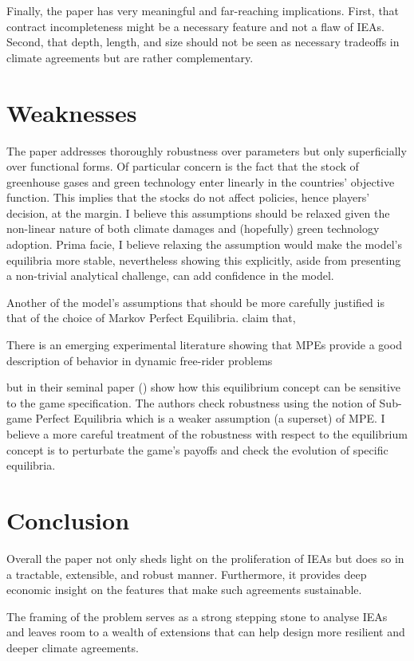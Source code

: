 \documentclass[american]{scrartcl}
\newcommand{\citein}[1]{\citeauthor{#1} (\citeyear{#1})}
\begin{document}
Finally, the paper has very meaningful and far-reaching implications. First, that contract incompleteness might be a necessary feature and not a flaw of IEAs. Second, that depth, length, and size should not be seen as necessary tradeoffs in climate agreements but are rather complementary.

\section{Weaknesses}

The paper addresses thoroughly robustness over parameters but only superficially over functional forms. Of particular concern is the fact that the stock of greenhouse gases and green technology enter linearly in the countries' objective function. This implies that the stocks do not affect policies, hence players' decision, at the margin. I believe this assumptions should be relaxed given the non-linear nature of both climate damages and (hopefully) green technology adoption. Prima facie, I believe relaxing the assumption would make the model's equilibria more stable, nevertheless showing this explicitly, aside from presenting a non-trivial analytical challenge, can add confidence in the model.

Another of the model's assumptions that should be more carefully justified is that of the choice of Markov Perfect Equilibria. \citeauthor{Battaglini2016} claim that,

\begin{displayquote}[p. 169][]
    There is an emerging experimental literature showing that MPEs provide a good description of behavior in dynamic free-rider problems
\end{displayquote}

but in their seminal paper \citein{Maskin1988} show how this equilibrium concept can be sensitive to the game specification. The authors check robustness using the notion of Sub-game Perfect Equilibria which is a weaker assumption (a superset) of MPE. I believe a more careful treatment of the robustness with respect to the equilibrium concept is to perturbate the game's payoffs and check the evolution of specific equilibria.

\section{Conclusion}

Overall the paper not only sheds light on the proliferation of IEAs but does so in a tractable, extensible, and robust manner. Furthermore, it provides deep economic insight on the features that make such agreements sustainable.

The framing of the problem serves as a strong stepping stone to analyse IEAs and leaves room to a wealth of extensions that can help design more resilient and deeper climate agreements.

\newpage
\nocite{*}
\printbibliography
\end{document}

